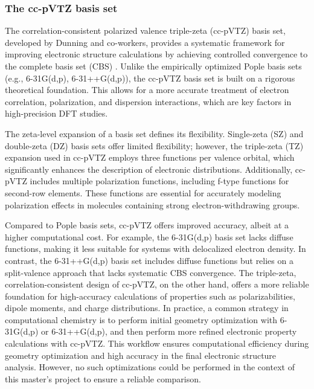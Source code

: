 \subsubsection{The cc-pVTZ basis set}

The correlation-consistent polarized valence triple-zeta (cc-pVTZ) basis set, developed by Dunning and co-workers, provides a systematic framework for improving electronic structure calculations by achieving controlled convergence to the complete basis set (CBS) \cite{Dunning1989}. Unlike the empirically optimized Pople basis sets (e.g., 6-31G(d,p), 6-31++G(d,p)), the cc-pVTZ basis set is built on a rigorous theoretical foundation. This allows for a more accurate treatment of electron correlation, polarization, and dispersion interactions, which are key factors in high-precision DFT studies.

The zeta-level expansion of a basis set defines its flexibility. Single-zeta (SZ) and double-zeta (DZ) basis sets offer limited flexibility; however, the triple-zeta (TZ) expansion used in cc-pVTZ employs three functions per valence orbital, which significantly enhances the description of electronic distributions. Additionally, cc-pVTZ includes multiple polarization functions, including f-type functions for second-row elements. These functions are essential for accurately modeling polarization effects in molecules containing strong electron-withdrawing groups. 

Compared to Pople basis sets, cc-pVTZ offers improved accuracy, albeit at a higher computational cost. For example, the 6-31G(d,p) basis set lacks diffuse functions, making it less suitable for systems with delocalized electron density. In contrast, the 6-31++G(d,p) basis set includes diffuse functions but relies on a split-valence approach that lacks systematic CBS convergence. The triple-zeta, correlation-consistent design of cc-pVTZ, on the other hand, offers a more reliable foundation for high-accuracy calculations of properties such as polarizabilities, dipole moments, and charge distributions. In practice, a common strategy in computational chemistry is to perform initial geometry optimization with 6-31G(d,p) or 6-31++G(d,p), and then perform more refined electronic property calculations with cc-pVTZ. This workflow ensures computational efficiency during geometry optimization and high accuracy in the final electronic structure analysis. However, no such optimizations could be performed in the context of this master’s project to ensure a reliable comparison. 

